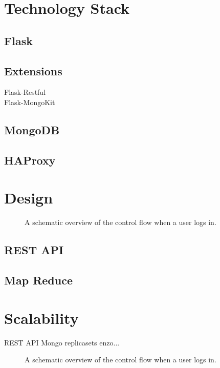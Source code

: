 \section{Technology Stack}
\label{sec:2:technologyStack}

\subsection{Flask}
\label{ssec:2:flask}

\subsection{Extensions}

\begin{description}

\item[Flask-Restful]
\item[Flask-MongoKit]

\end{description}

\subsection{MongoDB}
\label{ssec:2:mongodb}

\subsection{HAProxy}
\label{ssec:2:haproxy}

\section{Design}

\begin{figure}
	\caption{A schematic overview of the control flow when a user logs in.}
	\label{fig:2:overview_backend}
\end{figure}

\subsection{REST API}

\subsection{Map Reduce}

\section{Scalability}
REST API
Mongo replicasets enzo...

\begin{figure}
	\caption{A schematic overview of the control flow when a user logs in.}
	\label{fig:2:overview_backend}
\end{figure}
